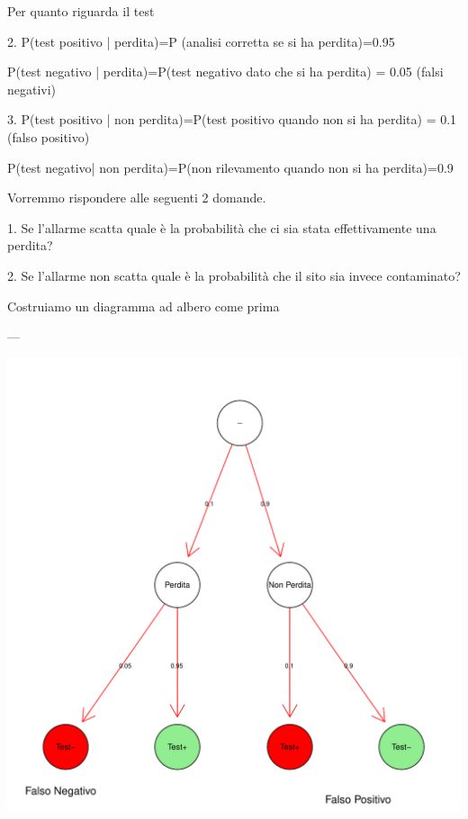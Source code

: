 \documentclass[onecolumn,12pt]{book}\usepackage[]{graphicx}\usepackage[]{color}
\makeatletter
\def\maxwidth{ %
  \ifdim\Gin@nat@width>\linewidth
    \linewidth
  \else
    \Gin@nat@width
  \fi
}
\newenvironment{knitrout}{}{} %
\makeatother
\begin{document}
Per quanto riguarda il test

2.   P(test positivo | perdita)=P (analisi corretta se si ha perdita)=0.95

     P(test negativo | perdita)=P(test negativo dato che  si ha perdita) =  0.05  (falsi negativi)

3.   P(test positivo | non perdita)=P(test positivo quando non si ha perdita) =    0.1  (falso positivo)
      
      P(test negativo| non perdita)=P(non rilevamento quando non si ha perdita)=0.9
      

Vorremmo rispondere alle seguenti 2 domande.

1.  Se l'allarme scatta quale è la probabilità che ci sia stata effettivamente una perdita?

2.  Se l'allarme non scatta quale è la probabilità che il sito sia invece contaminato?

Costruiamo un diagramma ad albero come prima

---



\begin{knitrout}
\color{fgcolor}
\includegraphics[width=\maxwidth]{figure/unnamed-chunk-20-1} 

\end{knitrout}
\end{document}
